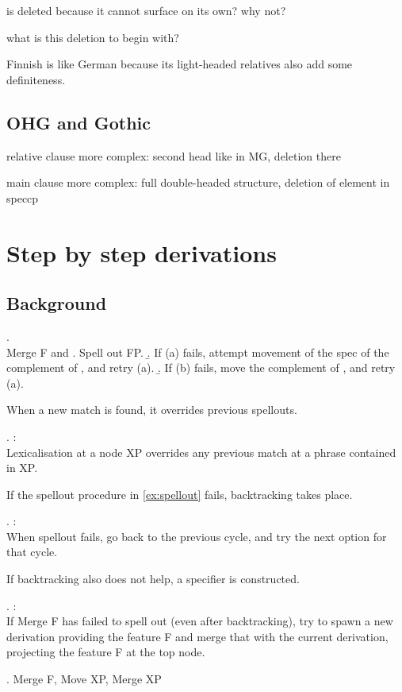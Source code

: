  is deleted because it cannot surface on its own? why not?

what is this deletion to begin with?

Finnish is like German because its light-headed relatives also add some definiteness.




\section{OHG and Gothic}

relative clause more complex: second head like in MG, deletion there

main clause more complex: full double-headed structure, deletion of element in speccp










\chapter{Step by step derivations}

\section{Background}

\ex. \\
Merge F and \label{ex:spellout}
 \a. Spell out FP.
 \b. If (a) fails, attempt movement of the spec of the complement of , and retry (a).
 \b. If (b) fails, move the complement of , and retry (a).

When a new match is found, it overrides previous spellouts.

\ex.  \citep{starke2018}:\\
Lexicalisation at a node XP overrides any previous match at a phrase contained in XP.

If the spellout procedure in \ref{ex:spellout} fails, backtracking takes place.

\ex.  \citep{starke2018}:\\
When spellout fails, go back to the previous cycle, and try the next option for that cycle.\label{ex:backtracking}

If backtracking also does not help, a specifier is constructed.

\ex.  \citep{starke2018}:\\
If Merge F has failed to spell out (even after backtracking), try to spawn a new derivation providing the feature F and merge that with the current derivation, projecting the feature F at the top node.\label{ex:specformation}

\ex. Merge F, Move XP, Merge XP

\phantom{hi}
